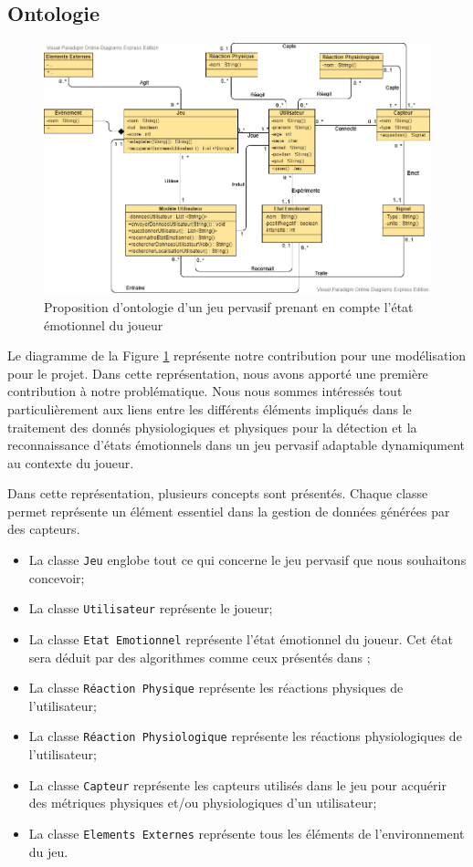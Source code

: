 \documentclass[11pt]{article}
\begin{document}
	\subsection{Ontologie}\label{sec:ontologie}
		\begin{figure}[t]
			\centering
			\includegraphics[scale=0.5]{../include/ontologie_stage_cnam-v2-5.png}
			\caption{Proposition d'ontologie d'un jeu pervasif prenant en compte l'état émotionnel du joueur}
			\label{fig:modele}
		\end{figure}
		Le diagramme de la Figure \ref{fig:modele} représente notre contribution pour une modélisation pour le projet.
		Dans cette représentation, nous avons apporté une première contribution à notre problématique.
		Nous nous sommes intéressés tout particulièrement aux liens entre les différents éléments impliqués dans le traitement des donnés physiologiques et physiques pour la détection et la reconnaissance d'états émotionnels dans un jeu pervasif adaptable dynamiqument au contexte du joueur.\par
		Dans cette représentation, plusieurs concepts sont présentés.
		Chaque classe permet représente un élément essentiel dans la gestion de données générées par des capteurs.
		\begin{itemize}
			\item La classe \texttt{Jeu} englobe tout ce qui concerne le jeu pervasif que nous souhaitons concevoir;
			\item La classe \texttt{Utilisateur} représente le joueur;
			\item La classe \texttt{Etat Emotionnel} représente l'état émotionnel du joueur. Cet état sera déduit par des algorithmes comme ceux présentés dans \cite{gal_2019, gal_et_al._2020};
			\item La classe \texttt{Réaction Physique} représente les réactions physiques de l'utilisateur;
			\item La classe \texttt{Réaction Physiologique} représente les réactions physiologiques de l'utilisateur;
			\item La classe \texttt{Capteur} représente les capteurs utilisés dans le jeu pour acquérir des métriques physiques et/ou physiologiques d'un utilisateur;
			\item La classe \texttt{Elements Externes} représente tous les éléments de l'environnement du jeu.
		\end{itemize}\par
\end{document}
